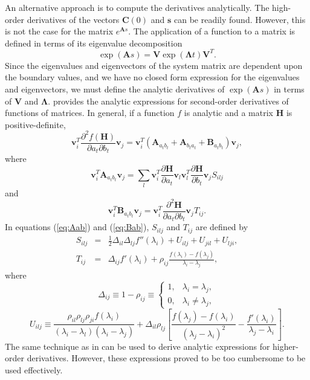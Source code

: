 An alternative approach is to compute the derivatives analytically. The high-order derivatives of the vectors $\mathbf{C}(0)$ and $\mathbf{s}$ can be readily found. However, this is not the case for the matrix $e^{\mathbf{A}s}$. The application of a function to a matrix is defined in terms of its eigenvalue decomposition 
\[ \exp(\mathbf{A}s) = \mathbf{V} \exp(\boldsymbol{\Lambda}t) \mathbf{V}^T. \]
Since the eigenvalues and eigenvectors of the system matrix are dependent upon the boundary values, and we have no closed form expression for the eigenvalues and eigenvectors, we must define the analytic derivatives of $\exp(\mathbf{A}s)$ in terms of $\mathbf{V}$ and $\boldsymbol{\Lambda}$. \cite{wilcox1967exponential} provides the analytic expressions for second-order derivatives of functions of matrices. In general, if a function $f$ is analytic and a matrix $\mathbf{H}$ is positive-definite, 
\[ 
	\mathbf{v}_i^T \frac{\partial^2 f(\mathbf{H})}{\partial a_t \partial b_t} \mathbf{v}_j = \mathbf{v}_i^T ( \mathbf{A}_{a_t b_t} + \mathbf{A}_{b_t a_t} + \mathbf{B}_{a_t b_t} ) \mathbf{v}_j,
\]
where
% 
\begin{equation} 
	\mathbf{v}_i^T \mathbf{A}_{a_t b_t} \mathbf{v}_j = \sum_{l} \mathbf{v}_i^T \frac{\partial \mathbf{H}}{\partial a_t}  \mathbf{v}_l \mathbf{v}_l^T \frac{\partial \mathbf{H}}{\partial b_t} \mathbf{v}_j  S_{ilj} \label{eq:Aab}
\end{equation}
%
and
%
\begin{equation} 
	\mathbf{v}_i^T \mathbf{B}_{a_t b_t} \mathbf{v}_j = \mathbf{v}_i^T \frac{\partial^2 \mathbf{H}}{\partial a_t \partial b_t}  \mathbf{v}_j T_{ij}. \label{eq:Bab}
\end{equation}
%
In equations (\ref{eq:Aab}) and (\ref{eq:Bab}), $S_{ilj}$ and $T_{ij}$ are defined by 
%
\begin{eqnarray*}
	S_{ilj} &=& \frac{1}{2} \Delta_{il}\Delta_{lj} f''( \lambda_{i} ) + U_{ilj} + U_{jil} + U_{lji}, \\
	T_{ij} &=& \Delta_{ij} f'(\lambda_i) + \rho_{ij} \frac{ f(\lambda_i) - f(\lambda_j) }{\lambda_{i} - \lambda_{j} },
\end{eqnarray*}
%
where 
%
\begin{equation}
	\Delta_{ij} \equiv 1 - \rho_{ij} \equiv \left\{ \begin{array}{lr} 
											1, & \lambda_i = \lambda_j, \\
											0, & \lambda_i \neq \lambda_j,				
										\end{array}		
									\right.
\end{equation}
%
\begin{equation}
	U_{ilj} \equiv \frac{\rho_{il} \rho_{lj} \rho_{ji} f(\lambda_i) }{(\lambda_i - \lambda_l)(\lambda_{i} - \lambda_{j})} + \Delta_{il}\rho_{lj} \left[ \frac{ f(\lambda_j) - f(\lambda_i) }{(\lambda_j - \lambda_i)^2} - \frac{ f'(\lambda_i) }{\lambda_j - \lambda_i} \right].
\end{equation}
The same technique as in \cite{wilcox1967exponential} can be used to derive analytic expressions for higher-order derivatives. However, these expressions proved to be too cumbersome to be used effectively.

